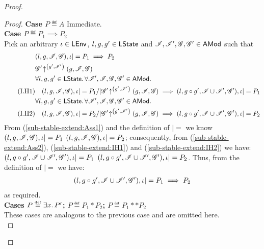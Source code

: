 \begin{lemma}[Stability]
\begin{proof}
{\begin{lemma}[]
\begin{proof}
\noindent\textbf{Case $P \eqdef A$\quad} Immediate.\\
\noindent\textbf{Case $P \eqdef P_1 \implies P_2$} \\
Pick an arbitrary $\iota \in \textsf{LEnv}$, $l, g, g' \in \textsf{LState}$ and $\mathscr{I}, \mathscr{I}', \mathscr{G}, \mathscr{G}' \in \textsf{AMod}$ such that
%
\begin{align}
	& (l, g, \lmod, \gmod), \lenv |= P_1 \implies P_2 \label{sub-stable-extend:Ass1}\\
%	
	&\expandsAM{\gmod'}{g'}{\lmod'}{g}{\lmod}{\gmod} \label{sub-stable-extend:Ass2}\\
%	
	& \for{l, g, g' \in \LStates} \for{\lmod', \lmod, \gmod, \gmod' \in \AMods} \nonumber\\
	\tag{I.H1} & 
	\quad (l, g, \lmod, \gmod), \lenv |= P_1 /| \expandsAM{\gmod'}{g'}{\lmod'}{g}{\lmod}{\gmod} \implies (l, g \composeL g', \lmod \cup \lmod', \gmod'), \lenv |= P_1 \label{sub-stable-extend:IH1}\\ 
%
	& \for{l, g, g' \in \LStates} \for{\lmod', \lmod, \gmod, \gmod' \in \AMods} \nonumber\\
	\tag{I.H2} & 
	\quad (l, g, \lmod, \gmod), \lenv |= P_2 /| \expandsAM{\gmod'}{g'}{\lmod'}{g}{\lmod}{\gmod} \implies (l, g \composeL g', \lmod \cup \lmod', \gmod'), \lenv |= P_2 \label{sub-stable-extend:IH2}
%	
\end{align}
%
From (\ref{sub-stable-extend:Ass1}) and the definition of $|=$ we know $(l, g, \mathscr{I}, \mathscr{G}), \iota |= P_1$  $(l, g, \mathscr{I}, \mathscr{G}), \iota |= P_2$; consequently, from (\ref{sub-stable-extend:Ass2}), (\ref{sub-stable-extend:IH1}) and (\ref{sub-stable-extend:IH2}) we have: $(l, g \circ g', \mathscr{I} \cup \mathscr{I}', \mathscr{G}'), \iota |= P_1$  $(l, g \circ g', \mathscr{I} \cup \mathscr{I}', \mathscr{G}'), \iota |= P_2$. Thus, from the definition of $|=$ we have:
%
\begin{align*}
	(l, g \circ g', \mathscr{I} \cup \mathscr{I}', \mathscr{G}'), \iota |= P_1 \implies P_2
\end{align*}
%
as required.\\

\noindent\textbf{Cases $P \mathrel{\stackrel{\smash{\scriptscriptstyle{\mathrm{def}}}}{=}} \exists x.\, P'$; $P \eqdef P_1 * P_2$; $P \eqdef P_1 ** P_2$} \\
These cases are analogous to the previous case and are omitted here. \\


\end{proof}
\end{lemma}}
\end{proof}
\end{lemma}
